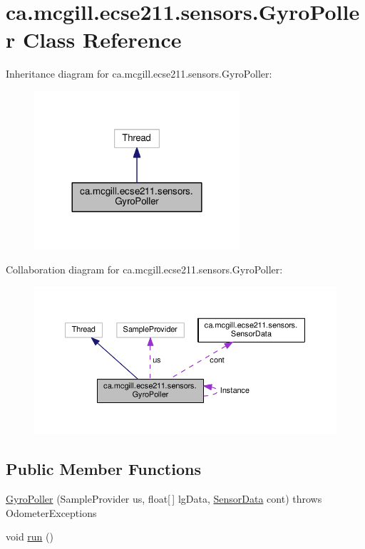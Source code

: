 \hypertarget{classca_1_1mcgill_1_1ecse211_1_1sensors_1_1_gyro_poller}{}\section{ca.\+mcgill.\+ecse211.\+sensors.\+Gyro\+Poller Class Reference}
\label{classca_1_1mcgill_1_1ecse211_1_1sensors_1_1_gyro_poller}


Inheritance diagram for ca.\+mcgill.\+ecse211.\+sensors.\+Gyro\+Poller\+:
\nopagebreak
\begin{figure}[H]
\begin{center}
\leavevmode
\includegraphics[width=216pt]{classca_1_1mcgill_1_1ecse211_1_1sensors_1_1_gyro_poller__inherit__graph}
\end{center}
\end{figure}


Collaboration diagram for ca.\+mcgill.\+ecse211.\+sensors.\+Gyro\+Poller\+:
\nopagebreak
\begin{figure}[H]
\begin{center}
\leavevmode
\includegraphics[width=350pt]{classca_1_1mcgill_1_1ecse211_1_1sensors_1_1_gyro_poller__coll__graph}
\end{center}
\end{figure}
\subsection*{Public Member Functions}
\begin{DoxyCompactItemize}
\item 
\hyperlink{classca_1_1mcgill_1_1ecse211_1_1sensors_1_1_gyro_poller_a284eec4434708068ce9cb8a9635f7830}{Gyro\+Poller} (Sample\+Provider us, float\mbox{[}$\,$\mbox{]} lg\+Data, \hyperlink{classca_1_1mcgill_1_1ecse211_1_1sensors_1_1_sensor_data}{Sensor\+Data} cont)  throws Odometer\+Exceptions 
\item 
void \hyperlink{classca_1_1mcgill_1_1ecse211_1_1sensors_1_1_gyro_poller_a2a52059192555ece72190fa44a761d28}{run} ()
\end{DoxyCompactItemize}
